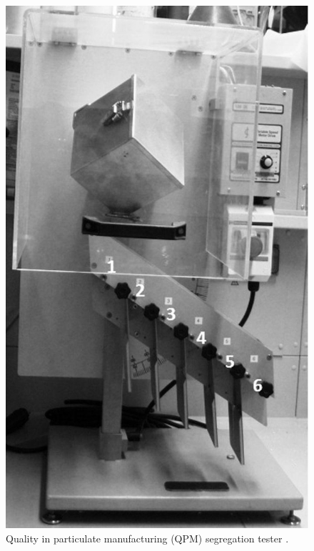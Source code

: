 \begin{figure}[!htb]
\centering
\includegraphics[width=.30\columnwidth]{images/126qpmtester}
\caption[QPM tester]{Quality in particulate manufacturing (QPM) segregation
tester
\cite{RefWorks:177}.}
\label{fig:126qpmtester}
\end{figure}